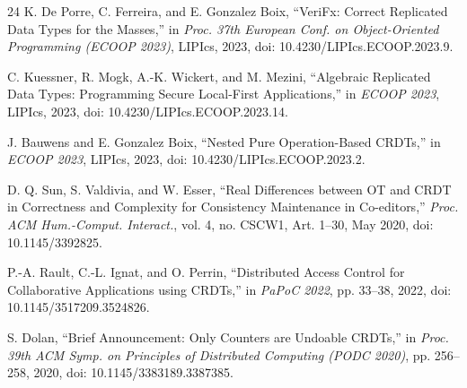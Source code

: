 \documentclass[pdflatex,sn-mathphys-num]{sn-jnl}
\begin{document}
\begin{thebibliography}{24}
K. De Porre, C. Ferreira, and E. Gonzalez Boix, ``VeriFx: Correct Replicated Data Types for the Masses,'' in \textit{Proc. 37th European Conf. on Object-Oriented Programming (ECOOP 2023)}, LIPIcs, 2023, doi: 10.4230/LIPIcs.ECOOP.2023.9.

C. Kuessner, R. Mogk, A.-K. Wickert, and M. Mezini, ``Algebraic Replicated Data Types: Programming Secure Local-First Applications,'' in \textit{ECOOP 2023}, LIPIcs, 2023, doi: 10.4230/LIPIcs.ECOOP.2023.14.

J. Bauwens and E. Gonzalez Boix, ``Nested Pure Operation-Based CRDTs,'' in \textit{ECOOP 2023}, LIPIcs, 2023, doi: 10.4230/LIPIcs.ECOOP.2023.2.

D. Q. Sun, S. Valdivia, and W. Esser, ``Real Differences between OT and CRDT in Correctness and Complexity for Consistency Maintenance in Co-editors,'' \textit{Proc. ACM Hum.-Comput. Interact.}, vol. 4, no. CSCW1, Art. 1--30, May 2020, doi: 10.1145/3392825.

P.-A. Rault, C.-L. Ignat, and O. Perrin, ``Distributed Access Control for Collaborative Applications using CRDTs,'' in \textit{PaPoC 2022}, pp. 33--38, 2022, doi: 10.1145/3517209.3524826.

S. Dolan, ``Brief Announcement: Only Counters are Undoable CRDTs,'' in \textit{Proc. 39th ACM Symp. on Principles of Distributed Computing (PODC 2020)}, pp. 256--258, 2020, doi: 10.1145/3383189.3387385.

\end{thebibliography}
\end{document}
